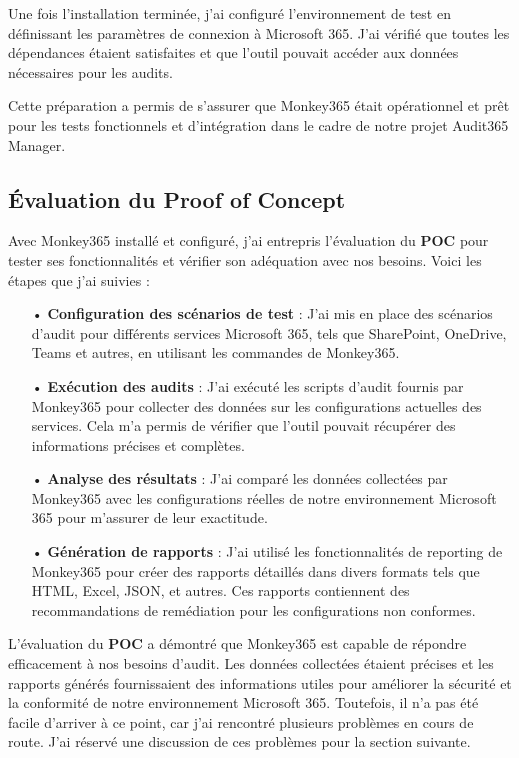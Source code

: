 Une fois l'installation terminée, j'ai configuré l'environnement de test en définissant les paramètres de connexion à Microsoft 365. J'ai vérifié que toutes les dépendances étaient satisfaites et que l'outil pouvait accéder aux données nécessaires pour les audits.

Cette préparation a permis de s'assurer que Monkey365 était opérationnel et prêt pour les tests fonctionnels et d'intégration dans le cadre de notre projet Audit365 Manager.

\subsection{Évaluation du Proof of Concept}

Avec Monkey365 installé et configuré, j'ai entrepris l'évaluation du \textbf{POC} pour tester ses fonctionnalités et vérifier son adéquation avec nos besoins. Voici les étapes que j'ai suivies :

\begin{itemize}
    \item[•] \textbf{Configuration des scénarios de test} : J'ai mis en place des scénarios d'audit pour différents services Microsoft 365, tels que SharePoint, OneDrive, Teams et autres, en utilisant les commandes de Monkey365.
    \item[•] \textbf{Exécution des audits} : J'ai exécuté les scripts d'audit fournis par Monkey365 pour collecter des données sur les configurations actuelles des services. Cela m'a permis de vérifier que l'outil pouvait récupérer des informations précises et complètes.
    \item[•] \textbf{Analyse des résultats} : J'ai comparé les données collectées par Monkey365 avec les configurations réelles de notre environnement Microsoft 365 pour m'assurer de leur exactitude.
    \item[•] \textbf{Génération de rapports} : J'ai utilisé les fonctionnalités de reporting de Monkey365 pour créer des rapports détaillés dans divers formats tels que HTML, Excel, JSON, et autres. Ces rapports contiennent des recommandations de remédiation pour les configurations non conformes.
\end{itemize}

L'évaluation du \textbf{POC} a démontré que Monkey365 est capable de répondre efficacement à nos besoins d'audit. Les données collectées étaient précises et les rapports générés fournissaient des informations utiles pour améliorer la sécurité et la conformité de notre environnement Microsoft 365. Toutefois, il n'a pas été facile d'arriver à ce point, car j'ai rencontré plusieurs problèmes en cours de route. J'ai réservé une discussion de ces problèmes pour la section suivante.

